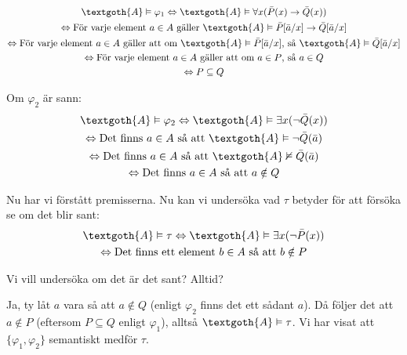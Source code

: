 \begin{equation*}
  \begin{gathered}
    \textgoth{A}\vDash\varphi_1\Lrarr\textgoth{A}\vDash\forall x(\bar{P}(x)\rightarrow\bar{Q}(x))\\
    \Lrarr \text{För varje element } a\in A \text{ gäller } \textgoth{A}\vDash\bar{P}[\bar{a}/x]\rightarrow\bar{Q}[\bar{a}/x]\\
    \Lrarr\text{För varje element } a\in A \text{ gäller att om } \textgoth{A}\vDash\bar{P}[\bar{a}/x]\text{, så } \textgoth{A}\vDash\bar{Q}[\bar{a}/x]\\
    \Lrarr \text{För varje element } a\in A \text{ gäller att om } a\in P \text{, så } a\in Q\\
    \Lrarr P\subseteq Q
  \end{gathered}
\end{equation*}
\par\bigskip
\noindent Om $\varphi_2$ är sann:
\begin{equation*}
  \begin{gathered}
    \textgoth{A}\vDash\varphi_2 \Lrarr\textgoth{A}\vDash\exists x(\neg\bar{Q}(x))\\
    \Lrarr\text{Det finns } a\in A\text{ så att } \textgoth{A}\vDash\neg\bar{Q}(\bar{a})\\
    \Lrarr \text{Det finns } a\in A\text{ så att } \textgoth{A}\nvDash\bar{Q}(\bar{a})\\
    \Lrarr \text{Det finns } a\in A\text{ så att } a\notin Q\\
  \end{gathered}
\end{equation*}
\par\bigskip
\noindent Nu har vi förstått premisserna. Nu kan vi undersöka vad $\tau$ betyder för att försöka se om det blir sant:
\begin{equation*}
  \begin{gathered}
    \textgoth{A}\vDash\tau\Lrarr\textgoth{A}\vDash\exists x(\neg\bar{P}(x))\\
    \Lrarr\text{Det finns ett element } b\in A \text{ så att } b\notin P
  \end{gathered}
\end{equation*}
\par\bigskip
\noindent Vi vill undersöka om det är det sant? Alltid?
\par\bigskip
\noindent Ja, ty låt $a$ vara så att $a\notin Q$ (enligt $\varphi_2$ finns det ett sådant $a$). Då följer det att $a\notin P$ (eftersom $P\subseteq Q$ enligt $\varphi_1$), alltså $\textgoth{A}\vDash\tau$. Vi har visat att $\{\varphi_1, \varphi_2\}$ semantiskt medför $\tau$.
